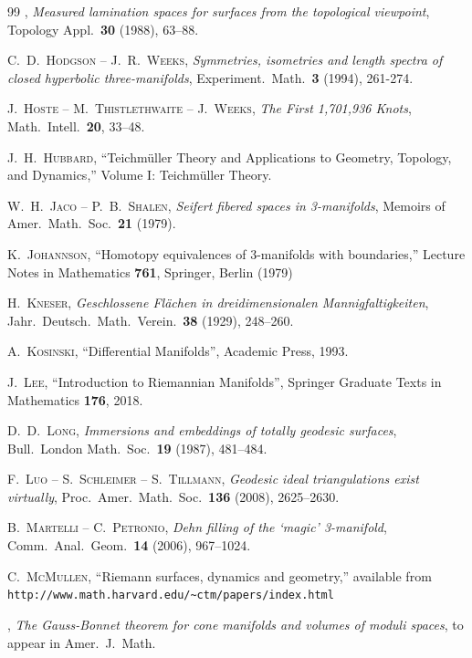 \begin{thebibliography}{99}
 \bysame, \emph{Measured lamination spaces for surfaces from the topological viewpoint}, Topology Appl.~\textbf{30} (1988), 63--88.

 \textsc{C.~D.~Hodgson -- J.~R.~Weeks},
\emph{Symmetries, isometries and length spectra of closed hyperbolic
    three-manifolds}, Experiment.~Math.~\textbf{3} (1994), 261-274.

 \textsc{J.~Hoste -- M.~Thistlethwaite -- J.~Weeks}, \emph{The First 1,701,936 Knots}, Math.~Intell.~\textbf{20}, 33--48.

 \textsc{J.~H.~Hubbard}, ``Teichm\"uller Theory and Applications to Geometry, Topology, and Dynamics,'' Volume I: Teichm\"uller Theory.

 \textsc{W.~H.~Jaco -- P.~B.~Shalen}, \emph{Seifert fibered spaces in 3-manifolds}, Memoirs of Amer.~Math.~Soc.~\textbf{21} (1979).

 \textsc{K.~Johannson}, ``Homotopy equivalences of 3-manifolds with boundaries,'' Lecture Notes in Mathematics \textbf{761}, Springer, Berlin (1979)

 \textsc{H.~Kneser}, \emph{Geschlossene Fl\"achen in dreidimensionalen Mannigfaltigkeiten}, Jahr.~Deutsch.~Math.~Verein.~\textbf{38} (1929), 248--260.

 \textsc{A.~Kosinski}, ``Differential Manifolds'', Academic Press, 1993.

 \textsc{J.~Lee}, ``Introduction to Riemannian Manifolds'', Springer Graduate Texts in Mathematics \textbf{176}, 2018. 

 \textsc{D.~D.~Long}, \emph{Immersions and embeddings of totally geodesic surfaces}, Bull.~London Math.~Soc.~\textbf{19} (1987), 481--484.

 \textsc{F.~Luo -- S.~Schleimer -- S.~Tillmann}, \emph{Geodesic ideal triangulations exist virtually}, Proc.~Amer.~Math.~Soc.~\textbf{136} (2008), 2625--2630.

 \textsc{B.~Martelli -- C.~Petronio}, \emph{Dehn filling of the `magic' 3-manifold}, Comm.~Anal.~Geom.~\textbf{14} (2006), 967--1024.

 \textsc{C.~McMullen}, ``Riemann surfaces, dynamics and
geometry,'' available from {\tt http://www.math.harvard.edu/\textasciitilde ctm/papers/index.html}

 \bysame, \emph{The Gauss-Bonnet theorem for cone manifolds and volumes of moduli spaces}, to appear in Amer.~J.~Math.


\end{thebibliography}
